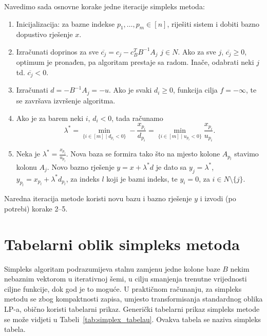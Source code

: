 \documentclass[a4paper, utf8, 11pt, colorlinks]{book}
\theoremstyle{definition}
\begin{document}
Navedimo sada osnovne korake jedne iteracije simpleks metoda:
\begin{enumerate}
    \item Inicijalizacija: za bazne indekse $p_1,\ldots,p_m \in [n]$, riješiti sistem i dobiti bazno dopustivo rješenje $x$. 
    \item Izračunati doprinos za sve $\overline{c_j} = c_j - c_B^T B^{-1}A_j $
          $j \in N$. Ako za sve $j$, $\overline{c_j} \geq 0$, optimum je pronađen, pa algoritam prestaje sa radom. Inače, odabrati neki $j$  td. $\overline{c_j}<0$.
    \item Izračunati $d = -B^{-1}A_j = -u$. Ako je svaki $d_i \geq  0$, funkcija cilja  $f = - \infty$, te se završava izvršenje algoritma. 
    \item Ako je za barem neki $i$, $d_i < 0$, tada računamo 
             $$ \lambda^* = \min_{ \{i\in [m] \mid d_{p_i} < 0  \}} - \frac{x_{p_i}}{d_{p_i}} =  \min_{ \{i\in [m] \mid u_{p_i} < 0  \}} \frac{x_{p_i}}{u_{p_i}}.$$
    \item Neka je $\lambda^* = \frac{x_{p_l}}{u_{p_l}}$. Nova baza se formira tako što na mjesto kolone $A_{p_l}$ stavimo kolonu $A_j$. Novo bazno rješenje 
    $y = x + \lambda^*d $ je dato sa $y_j = \lambda^*$, $y_{p_l} = x_{p_l} + \lambda^* d_{p_l}$, za indeks $l$ koji je bazni indeks, te $y_i = 0$, za $i \in N \setminus \{j\}$. 
\end{enumerate}

Naredna iteracija metode koristi novu bazu i bazno rješenje $y$ i izvodi (po potrebi) korake 2--5. 



\section{Tabelarni oblik simpleks metoda}
 

Simpleks algoritam podrazumijeva stalnu zamjenu jedne kolone baze $B$ nekim nebaznim vektorom u iterativnoj šemi, u cilju smanjenja trenutne vrijednosti ciljne funkcije, dok god je to moguće. 
U praktičnom računanju, za simpleks metodu se zbog kompaktnosti zapisa,  umjesto transformisanja standardnog oblika LP-a, obično koristi tabelarni prikaz.
Generički tabelarni  prikaz simpleks metode se može vidjeti u Tabeli~\ref{tab:simplex_tabelau}. Ovakva tabela se naziva  simpleks tabela.
\end{document}

